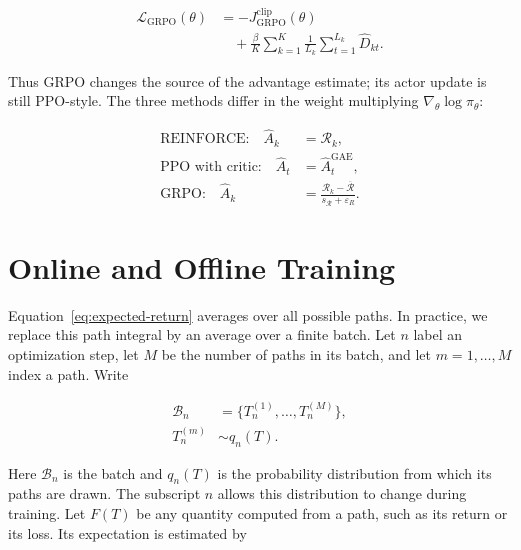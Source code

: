 \documentclass[11pt]{article}
\begin{document}
\begin{equation}
    \begin{split}
    \mathcal L_{\mathrm{GRPO}}(\theta)
      &=-J_{\mathrm{GRPO}}^{\mathrm{clip}}(\theta)\\
      &\quad+\frac{\beta}{K}\sum_{k=1}^{K}\frac{1}{L_k}
       \sum_{t=1}^{L_k}\widehat D_{kt}.
    \end{split}
    \label{eq:grpo-total-loss}
\end{equation}

Thus GRPO changes the source of the advantage estimate; its actor update is
still PPO-style.  The three methods differ in the weight multiplying
\(\nabla_\theta\log\pi_\theta\):

\begin{equation}
    \begin{split}
    \text{REINFORCE:}\quad
      \widehat A_k&=\mathcal R_k,\\
    \text{PPO with critic:}\quad
      \widehat A_t&=\widehat A_t^{\mathrm{GAE}},\\
    \text{GRPO:}\quad
      \widehat A_k&=\frac{\mathcal R_k-\overline{\mathcal R}}
                          {s_{\mathcal R}+\varepsilon_R}.
    \end{split}
    \label{eq:advantage-family}
\end{equation}

\newpage
\section{Online and Offline Training}

Equation~\eqref{eq:expected-return} averages over all possible paths.  In
practice, we replace this path integral by an average over a finite batch.
Let \(n\) label an optimization step, let \(M\) be the number of paths in its
batch, and let \(m=1,\ldots,M\) index a path.  Write

\begin{equation}
    \begin{split}
    \mathcal B_n
    &=\{T_n^{(1)},\ldots,T_n^{(M)}\},\\
    T_n^{(m)}&\sim q_n(T).
    \end{split}
    \label{eq:sampling-measure}
\end{equation}

Here \(\mathcal B_n\) is the batch and \(q_n(T)\) is the probability
distribution from which its paths are drawn.  The subscript \(n\) allows this
distribution to change during training.  Let \(F(T)\) be any quantity
computed from a path, such as its return or its loss.  Its expectation is
estimated by
\end{document}
